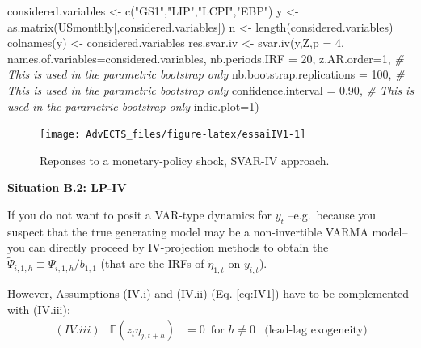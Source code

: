 \documentclass[
]{book}
\newenvironment{Shaded}{\begin{snugshade}}{\end{snugshade}}
\newcommand{\AttributeTok}[1]{\textcolor[rgb]{0.77,0.63,0.00}{#1}}
\newcommand{\CommentTok}[1]{\textcolor[rgb]{0.56,0.35,0.01}{\textit{#1}}}
\newcommand{\DecValTok}[1]{\textcolor[rgb]{0.00,0.00,0.81}{#1}}
\newcommand{\FloatTok}[1]{\textcolor[rgb]{0.00,0.00,0.81}{#1}}
\newcommand{\FunctionTok}[1]{\textcolor[rgb]{0.00,0.00,0.00}{#1}}
\newcommand{\NormalTok}[1]{#1}
\newcommand{\OtherTok}[1]{\textcolor[rgb]{0.56,0.35,0.01}{#1}}
\newcommand{\StringTok}[1]{\textcolor[rgb]{0.31,0.60,0.02}{#1}}
\theoremstyle{definition}
\theoremstyle{definition}
\theoremstyle{definition}
\theoremstyle{definition}
\theoremstyle{remark}
\begin{document}
\begin{Shaded}
\begin{Highlighting}[]
\NormalTok{considered.variables }\OtherTok{\textless{}{-}} \FunctionTok{c}\NormalTok{(}\StringTok{"GS1"}\NormalTok{,}\StringTok{"LIP"}\NormalTok{,}\StringTok{"LCPI"}\NormalTok{,}\StringTok{"EBP"}\NormalTok{)}
\NormalTok{y }\OtherTok{\textless{}{-}} \FunctionTok{as.matrix}\NormalTok{(USmonthly[,considered.variables])}
\NormalTok{n }\OtherTok{\textless{}{-}} \FunctionTok{length}\NormalTok{(considered.variables)}
\FunctionTok{colnames}\NormalTok{(y) }\OtherTok{\textless{}{-}}\NormalTok{ considered.variables}
\NormalTok{res.svar.iv }\OtherTok{\textless{}{-}} \FunctionTok{svar.iv}\NormalTok{(y,Z,}\AttributeTok{p =} \DecValTok{4}\NormalTok{,}
                       \AttributeTok{names.of.variables=}\NormalTok{considered.variables,}
                       \AttributeTok{nb.periods.IRF =} \DecValTok{20}\NormalTok{,}
                       \AttributeTok{z.AR.order=}\DecValTok{1}\NormalTok{, }\CommentTok{\# This is used in the parametric bootstrap only}
                       \AttributeTok{nb.bootstrap.replications =} \DecValTok{100}\NormalTok{, }\CommentTok{\# This is used in the parametric bootstrap only}
                       \AttributeTok{confidence.interval =} \FloatTok{0.90}\NormalTok{, }\CommentTok{\# This is used in the parametric bootstrap only}
                       \AttributeTok{indic.plot=}\DecValTok{1}\NormalTok{)}
\end{Highlighting}
\end{Shaded}

\begin{figure}
\texttt{[image: AdvECTS\_files/figure-latex/essaiIV1-1]} \caption{Reponses to a monetary-policy shock, SVAR-IV approach.}\label{fig:essaiIV1}
\end{figure}

\textbf{Situation B.2: LP-IV}

If you do not want to posit a VAR-type dynamics for \(y_t\) --e.g.~because you suspect that the true generating model may be a non-invertible VARMA model-- you can directly proceed by IV-projection methods to obtain the \(\tilde\Psi_{i,1,h}\equiv \Psi_{i,1,h}/b_{1,1}\) (that are the IRFs of \(\tilde\eta_{1,t}\) on \(y_{i,t}\)).

However, Assumptions (IV.i) and (IV.ii) (Eq. \eqref{eq:IV1}) have to be complemented with (IV.iii):
\begin{equation*}
\begin{array}{llll}
(IV.iii) & \mathbb{E}(z_t \eta_{j,t+h}) &= 0 \, \mbox{ for } h \ne 0 & \mbox{(lead-lag exogeneity)}
\end{array}
\end{equation*}
\end{document}
